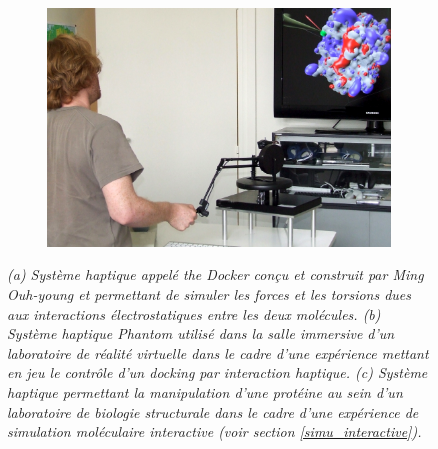 \begin{figure}[h]
  \begin{subfigure}{.34\textwidth}
  \centering
  {\includegraphics[width=0.98\linewidth]{./figures/ch2/ferey_haptic}}
    \caption{}
    \label{Fig:ferey_haptic}
  \end{subfigure}
  \caption[Système haptique \textit{the Docker}. (b) Système haptique Phantom. (c) Système haptique permettant la manipulation d'une protéine.]{\it (a) Système haptique appelé \textit{the Docker} conçu et construit par Ming Ouh-young et permettant de simuler les forces et les torsions dues aux interactions électrostatiques entre les deux molécules.
  (b) Système haptique Phantom utilisé dans la salle immersive d'un laboratoire de réalité virtuelle dans le cadre d'une expérience mettant en jeu le contrôle d'un docking par interaction haptique. 
  (c) Système haptique permettant la manipulation d'une protéine au sein d'un laboratoire de biologie structurale dans le cadre d'une expérience de simulation moléculaire interactive (voir section \ref{simu_interactive}).
  }
\end{figure}

